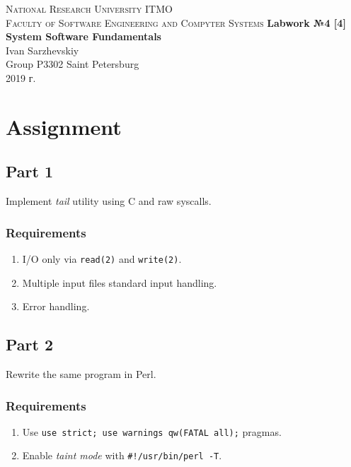 \documentclass[12pt, a4paper]{article}
\begin{document}
\begin{titlepage}
\begin{center}

\textsc{National Research University ITMO\\[4mm]
Faculty of Software Engineering and Compyter Systems}
\vfill
\textbf{Labwork №4 [4]\\[4mm]
System Software Fundamentals\\[16mm]
}
Ivan Sarzhevskiy
\\[2mm]Group P3302
\vfill
Saint Petersburg\\[2mm]
2019 г.

\end{center}
\end{titlepage}

\section*{Assignment}

\subsection*{Part 1}

Implement \textit{tail} utility using C and raw syscalls.

\subsubsection*{Requirements}

\begin{enumerate}
\item I/O only via \verb|read(2)| and \verb|write(2)|.
\item Multiple input files standard input handling.
\item Error handling.
\end{enumerate}

\subsection*{Part 2}

Rewrite the same program in Perl.

\subsubsection*{Requirements}

\begin{enumerate}
\item Use \verb|use strict; use warnings qw(FATAL all);| pragmas.
\item Enable \textit{taint mode} with \verb|#!/usr/bin/perl -T|.
\end{enumerate}
\end{document}
